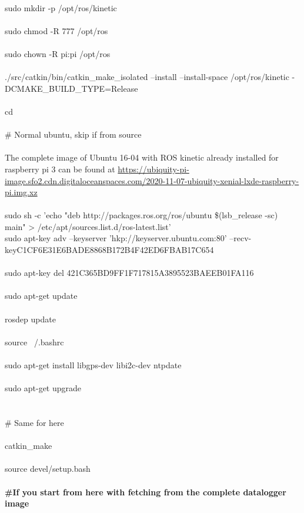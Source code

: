 \documentclass{report}
\begin{document}
\\
sudo mkdir -p /opt/ros/kinetic \\
\\
sudo chmod -R 777 /opt/ros \\
\\
sudo chown -R pi:pi /opt/ros \\
\\
./src/catkin/bin/catkin\_make\_isolated --install --install-space /opt/ros/kinetic -DCMAKE\_BUILD\_TYPE=Release \\
\\
cd\\
\\
\# Normal ubuntu, skip if from source\\
\\
The complete image of Ubuntu 16-04 with ROS kinetic already installed for raspberry pi 3 can be found at \url{https://ubiquity-pi-image.sfo2.cdn.digitaloceanspaces.com/2020-11-07-ubiquity-xenial-lxde-raspberry-pi.img.xz}\\
\\
sudo sh -c 'echo "deb http://packages.ros.org/ros/ubuntu \$(lsb\_release -sc) main" > /etc/apt/sources.list.d/ros-latest.list' 
\\
sudo apt-key adv --keyserver 'hkp://keyserver.ubuntu.com:80' --recv-keyC1CF6E31E6BADE8868B172B4F42ED6FBAB17C654 \\
\\
sudo apt-key del 421C365BD9FF1F717815A3895523BAEEB01FA116 \\
\\
sudo apt-get update\\
\\
rosdep update\\
\\
source ~/.bashrc\\
\\
sudo apt-get install libgps-dev libi2c-dev ntpdate\\
\\
sudo apt-get upgrade\\
\\
\\
\# Same for here\\
\\
catkin\_make\\
\\
source devel/setup.bash\\
\\
\textbf{\#If you start from here with fetching from the complete datalogger image}\\
\end{document}
